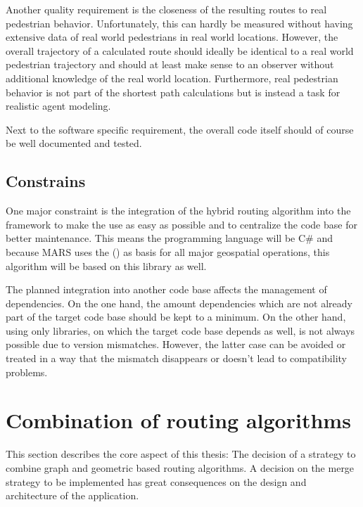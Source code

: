 		Another quality requirement is the closeness of the resulting routes to real pedestrian behavior.
		Unfortunately, this can hardly be measured without having extensive data of real world pedestrians in real world locations.
		However, the overall trajectory of a calculated route should ideally be identical to a real world pedestrian trajectory and should at least make sense to an observer without additional knowledge of the real world location.
		Furthermore, real pedestrian behavior is not part of the shortest path calculations but is instead a task for realistic agent modeling.

		Next to the software specific requirement, the overall code itself should of course be well documented and tested.
	
	\subsection{Constrains}
	\label{subsec:constrains}
		
		One major constraint is the integration of the hybrid routing algorithm into the  framework to make the use as easy as possible and to centralize the code base for better maintenance.
		This means the programming language will be C\# and because MARS uses the  () as basis for all major geospatial operations, this algorithm will be based on this library as well.
		
		The planned integration into another code base affects the management of dependencies.
		On the one hand, the amount dependencies which are not already part of the target code base should be kept to a minimum.
		On the other hand, using only libraries, on which the target code base depends as well, is not always possible due to version mismatches.
		However, the latter case can be avoided or treated in a way that the mismatch disappears or doesn't lead to compatibility problems.
	
	
\section{Combination of routing algorithms}
\label{sec:combining-routing-algorithms}

	This section describes the core aspect of this thesis:
	The decision of a strategy to combine graph and geometric based routing algorithms.
	A decision on the merge strategy to be implemented has great consequences on the design and architecture of the application.
	
